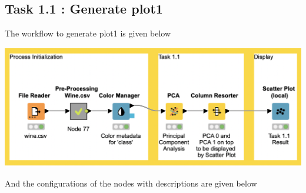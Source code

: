 \documentclass[11pt]{article}
\begin{document}
		\subsection*{Task 1.1 : Generate plot1}
			The workflow to generate plot1 is given below
			\iftrue
			\begin{center}
				\includegraphics[scale=0.5]{res/t1/t11/t11-workflow}
			\end{center}
			\fi
			And the configurations of the nodes with descriptions are given below
			\iftrue
\end{document}
